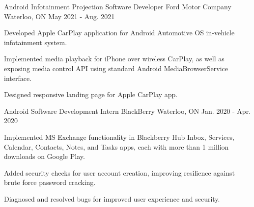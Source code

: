 \begin{cventries}
  \cventry
    {Android Infotainment Projection Software Developer} %
    {Ford Motor Company} %
    {Waterloo, ON} %
    {May 2021 - Aug. 2021} %
    {
      \begin{cvitems} %
        \item {Developed Apple CarPlay application for Android Automotive OS in-vehicle infotainment system.}
        \item {Implemented media playback for iPhone over wireless CarPlay, as well as exposing media control API using standard Android MediaBrowserService interface.}
        \item {Designed responsive landing page for Apple CarPlay app.}
      \end{cvitems}
    }

  \cventry
    {Android Software Development Intern} %
    {BlackBerry} %
    {Waterloo, ON} %
    {Jan. 2020 - Apr. 2020} %
    {
      \begin{cvitems} %
        \item {Implemented MS Exchange functionality in Blackberry Hub Inbox, Services, Calendar, Contacts, Notes, and Tasks apps, each with more than 1 million downloads on Google Play.}
        \item {Added security checks for user account creation, improving resilience against brute force password cracking.}
        \item {Diagnosed and resolved bugs for improved user experience and security.}
      \end{cvitems}
    }

\end{cventries}
